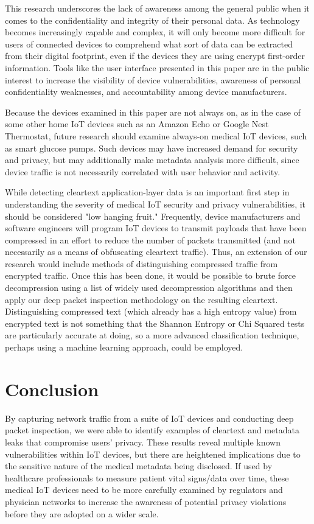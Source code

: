 This research underscores the lack of awareness among the general public when it comes to the confidentiality and integrity of their personal data. As technology becomes increasingly capable and complex, it will only become more difficult for users of connected devices to comprehend what sort of data can be extracted from their digital footprint, even if the devices they are using encrypt first-order information. Tools like the user interface presented in this paper are in the public interest to increase the visibility of device vulnerabilities, awareness of personal confidentiality weaknesses, and accountability among device manufacturers.

Because the devices examined in this paper are not always on, as in the case
of some other home IoT devices such as an Amazon Echo or Google Nest
Thermostat, future research should examine always-on medical IoT devices, such
as smart glucose pumps. Such devices may have increased demand for security
and privacy, but may additionally make metadata analysis more difficult, since
device traffic is not necessarily correlated with user behavior and activity.

While detecting cleartext application-layer data is an important first step in understanding
the severity of medical IoT security and privacy vulnerabilities, it should be considered "low hanging fruit." Frequently, device manufacturers and software engineers will program IoT devices to transmit payloads that have been compressed in an effort to reduce the number of packets transmitted (and not necessarily as a means of obfuscating cleartext traffic). Thus, an extension of our research would include methods of distinguishing compressed traffic from encrypted traffic. Once this has been done, it would be possible to brute force decompression using a list of widely used decompression algorithms and then apply our deep packet inspection methodology on the resulting cleartext. Distinguishing compressed text (which already has a high entropy value) from encrypted text is not something that the Shannon Entropy or Chi Squared tests are particularly accurate at doing, so a more advanced classification technique, perhaps using a machine learning approach, could be employed. 

\section{Conclusion}

By capturing network traffic from a suite of IoT devices and conducting deep packet inspection, we were able to identify examples of cleartext and metadata leaks that compromise users' privacy. These results reveal multiple known vulnerabilities within IoT devices, but there are heightened implications due to the sensitive nature of the medical metadata being disclosed. If used by healthcare professionals to measure patient vital signs/data over time, these medical IoT devices need to be more carefully examined by regulators and physician networks to increase the awareness of potential privacy violations before they are adopted on a wider scale. 

